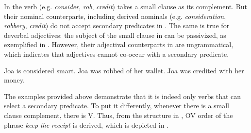 \largerpage
In  the verb (e.g. \textit{consider}, \textit{rob}, \textit{credit}) takes a small clause as its complement. But their nominal counterparts, including derived nominals (e.g. \textit{consideration}, \textit{robbery}, \textit{credit}) do not accept secondary predicates in . The same is true for deverbal adjectives: the subject of the small clause in  can be passivized, as exemplified in . However, their adjectival counterparts in  are ungrammatical, which indicates that adjectives cannot co-occur with a secondary predicate.

\ea\label{ex:136}
    \ea Joa is considered smart.
    \ex Joa was robbed of her wallet.
    \ex Joa was credited with her money.
    \z
\ex\label{ex:137}
    \z
\z

The examples provided above demonstrate that it is indeed only verbs that can select a secondary predicate. To put it differently, whenever there is a small clause complement, there is V. Thus, from the structure in , \ac{OV} order of the phrase \textit{keep} \textit{the} \textit{receipt} is derived, which is depicted in .

\ea\label{ex:138}
\z

